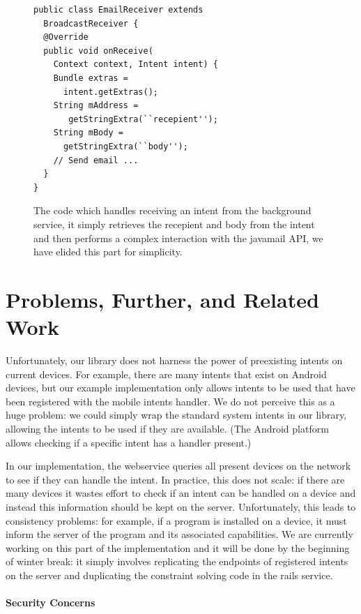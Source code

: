 \documentclass{acm_proc_article-sp}
\begin{document}
\begin{figure}
  \label{fig:email-receiver}
  \begin{lstlisting}
public class EmailReceiver extends
  BroadcastReceiver {
  @Override
  public void onReceive(
    Context context, Intent intent) {
    Bundle extras = 
      intent.getExtras();
    String mAddress =
       getStringExtra(``recepient'');
    String mBody = 
      getStringExtra(``body'');
    // Send email ...
  }
} 
\end{lstlisting}
\caption{The code which handles receiving an intent from the
  background service, it simply retrieves the recepient and body from
  the intent and then performs a complex interaction with the javamail
  API, we have elided this part for simplicity.}
\end{figure}

\section{Problems, Further, and Related Work}

Unfortunately, our library does not harness the power of preexisting
intents on current devices.  For example, there are many intents that
exist on Android devices, but our example implementation only allows
intents to be used that have been registered with the mobile intents
handler.  We do not perceive this as a huge problem: we could simply
wrap the standard system intents in our library, allowing the intents
to be used if they are available.  (The Android platform allows
checking if a specific intent has a handler present.)

In our implementation, the webservice queries all present devices on
the network to see if they can handle the intent.  In practice, this
does not scale: if there are many devices it wastes effort to check if
an intent can be handled on a device and instead this information
should be kept on the server.  Unfortunately, this leads to
consistency problems: for example, if a program is installed on a
device, it must inform the server of the program and its associated
capabilities.  We are currently working on this part of the
implementation and it will be done by the beginning of winter break:
it simply involves replicating the endpoints of registered intents on
the server and duplicating the constraint solving code in the rails
service.

\paragraph{Security Concerns}
\end{document}
